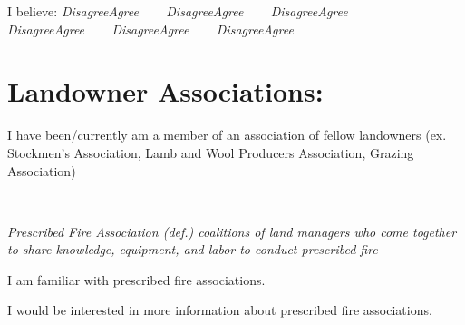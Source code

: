 \documentclass[
  english,
  ]{sdapsclassic}
\begin{document}
\begin{questionnaire}
\begin{multicols}{2}
      \begin{markgroup}{I believe:}
        {\emph{Disagree}}{\emph{Agree}~~} {}~{}
        {\emph{Disagree}}{\emph{Agree}~~} {}~{}
        {\emph{Disagree}}{\emph{Agree}~~} {}~{}
        {\emph{Disagree}}{\emph{Agree}~~} {}~{}
        {\emph{Disagree}}{\emph{Agree}~~} {}~{}
        {\emph{Disagree}}{\emph{Agree}~~} {}~{}
      \end{markgroup}
    
    \end{multicols}
    
    \section{Landowner Associations:}
    
    \begin{choicequestion}[cols=2]{I have been/currently am a member of an association of fellow landowners (ex. Stockmen's Association, Lamb and Wool Producers Association, Grazing Association)}
    \end{choicequestion}
    
     {}~{}
    
    \emph{Prescribed Fire Association (def.) coalitions of land managers who come together to share knowledge, equipment, and labor to conduct prescribed fire}
    
    \begin{choicequestion}[cols=2]{I am familiar with prescribed fire associations.}
    \end{choicequestion}    
    
    \begin{choicequestion}[cols=2]{I would be interested in more information about prescribed fire associations.}
    \end{choicequestion}    
    

\end{questionnaire}
\end{document}
